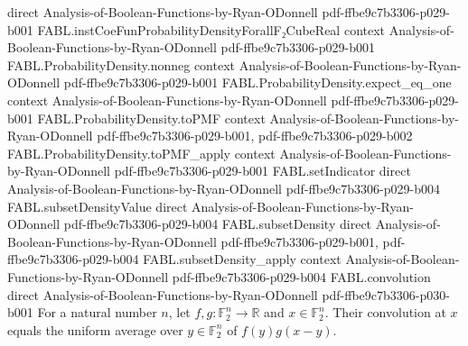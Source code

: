 \begin{theorem}
  {direct}
  {Analysis-of-Boolean-Functions-by-Ryan-ODonnell}
  {pdf-ffbe9c7b3306-p029-b001}
\proofstep
  {FABL.instCoeFunProbabilityDensityForallF₂CubeReal}
  {context}
  {Analysis-of-Boolean-Functions-by-Ryan-ODonnell}
  {pdf-ffbe9c7b3306-p029-b001}
\proofstep
  {FABL.ProbabilityDensity.nonneg}
  {context}
  {Analysis-of-Boolean-Functions-by-Ryan-ODonnell}
  {pdf-ffbe9c7b3306-p029-b001}
\proofstep
  {FABL.ProbabilityDensity.expect_eq_one}
  {context}
  {Analysis-of-Boolean-Functions-by-Ryan-ODonnell}
  {pdf-ffbe9c7b3306-p029-b001}
\proofstep
  {FABL.ProbabilityDensity.toPMF}
  {context}
  {Analysis-of-Boolean-Functions-by-Ryan-ODonnell}
  {pdf-ffbe9c7b3306-p029-b001,
    pdf-ffbe9c7b3306-p029-b002}
\proofstep
  {FABL.ProbabilityDensity.toPMF_apply}
  {context}
  {Analysis-of-Boolean-Functions-by-Ryan-ODonnell}
  {pdf-ffbe9c7b3306-p029-b001}
\proofstep
  {FABL.setIndicator}
  {direct}
  {Analysis-of-Boolean-Functions-by-Ryan-ODonnell}
  {pdf-ffbe9c7b3306-p029-b004}
\proofstep
  {FABL.subsetDensityValue}
  {direct}
  {Analysis-of-Boolean-Functions-by-Ryan-ODonnell}
  {pdf-ffbe9c7b3306-p029-b004}
\proofstep
  {FABL.subsetDensity}
  {direct}
  {Analysis-of-Boolean-Functions-by-Ryan-ODonnell}
  {pdf-ffbe9c7b3306-p029-b001,
    pdf-ffbe9c7b3306-p029-b004}
\proofstep
  {FABL.subsetDensity_apply}
  {context}
  {Analysis-of-Boolean-Functions-by-Ryan-ODonnell}
  {pdf-ffbe9c7b3306-p029-b004}
\proofstep
  {FABL.convolution}
  {direct}
  {Analysis-of-Boolean-Functions-by-Ryan-ODonnell}
  {pdf-ffbe9c7b3306-p030-b001}
For a natural number $n$, let $f,g:\mathbb{F}_2^n\to\mathbb{R}$ and
$x\in\mathbb{F}_2^n$. Their convolution at $x$ equals the uniform average over
$y\in\mathbb{F}_2^n$ of $f(y)g(x-y)$.
\end{theorem}

